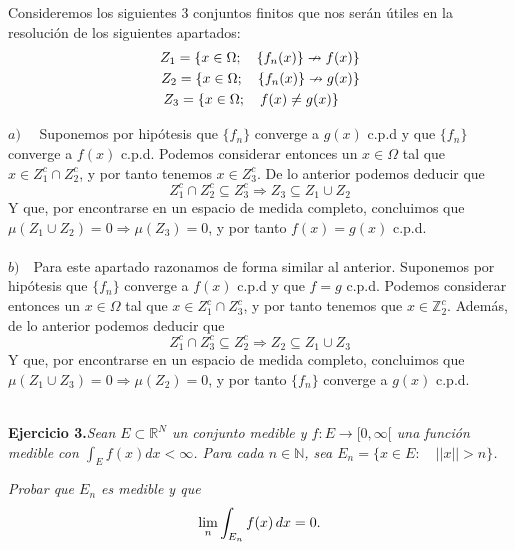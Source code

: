 \documentclass[fleqn]{article}
\def\R{\mathds{R}}
\def\Z{\mathds{Z}}
\def\N{\mathds{N}}
\begin{document}
    Consideremos los siguientes 3 conjuntos finitos que nos serán útiles en la resolución de los siguientes apartados:
    \begin{equation*}
        \begin{aligned}
            Z_1=\{x\in \Omega;\quad \{f_n(x)\}\nrightarrow f(x)\} \\
            Z_2=\{x\in \Omega;\quad \{f_n(x)\}\nrightarrow g(x)\}\\
            Z_3=\{x\in \Omega;\quad f(x) \neq g(x)\} \quad \thinspace \thinspace \thinspace
        \end{aligned}
    \end{equation*}

    $a) \quad$ Suponemos por hipótesis que $\{f_n\}$ converge a $g(x)$ c.p.d y que $\{f_n\}$ converge a $f(x)$ c.p.d. Podemos considerar entonces
    un $x\in \Omega$ tal que $x \in Z_1^c \cap Z_2^c$, y por tanto tenemos $x \in Z_3^c$. De lo anterior podemos deducir que 
    $$Z_1^c \cap Z_2^c \subseteq Z_3^c \Rightarrow Z_3 \subseteq Z_1 \cup Z_2$$
    Y que, por encontrarse en un espacio de medida completo, concluimos que $ \mu(Z_1 \cup Z_2)=0 \Rightarrow \mu(Z_3)=0$, y por tanto $f(x)=g(x)$ c.p.d. \\ \\

    $b) \quad$Para este apartado razonamos de forma similar al anterior. Suponemos por hipótesis que $\{f_n\}$ converge a $f(x)$ c.p.d 
    y que $f=g$ c.p.d. Podemos considerar entonces un $x\in \Omega$ tal que $x \in Z_1^c \cap Z_3^c$, y por tanto tenemos que $x \in \Z_2^c$. Además, de lo anterior podemos deducir que 
    $$Z_1^c \cap Z_3^c \subseteq Z_2^c \Rightarrow Z_2 \subseteq Z_1 \cup Z_3$$
    Y que, por encontrarse en un espacio de medida completo, concluimos que $\mu(Z_1 \cup Z_3)=0 \Rightarrow \mu(Z_2)=0$, y por tanto $\{f_n\}$ converge a $g(x)$ c.p.d. \\ \\

    \newpage

    \textbf{Ejercicio 3.}\textit{Sean $E \subset \R^N$ un conjunto medible y $f : E \longrightarrow [0,\infty[$ una función medible con
    $\int_E f(x) dx < \infty$. Para cada $n \in \N$, sea $E_n = \{x \in E: \quad ||x||>n\}$.}
    
    \textit{Probar que $E_n$ es medible y que 
    $$\lim_n \int_{E_n} f(x) \thinspace dx = 0.$$}\\ \\ 
\end{document}
